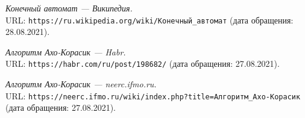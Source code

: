 \begin{thebibliography}{99}

{\itshape Конечный автомат — Википедия.} \\URL: \texttt{https://ru.wikipedia.org/wiki/Конечный\_автомат} (дата обращения: 28.08.2021).

{\itshape Алгоритм Ахо-Корасик — Habr.} \\URL: \texttt{https://habr.com/ru/post/198682/} (дата обращения: 27.08.2021).

{\itshape Алгоритм Ахо-Корасик — neerc.ifmo.ru.} \\URL: \texttt{https://neerc.ifmo.ru/wiki/index.php?title=Алгоритм\_Ахо-Корасик} (дата обращения: 27.08.2021).

\end{thebibliography}
\pagebreak